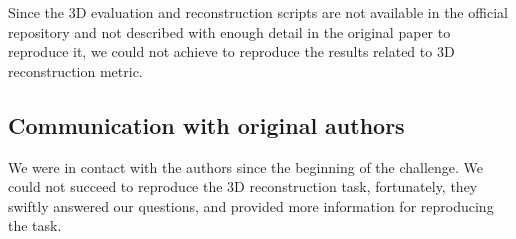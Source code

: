 Since the 3D evaluation and reconstruction scripts are not available in the official repository and not described with enough detail in the original paper to reproduce it, we could not achieve to reproduce the results related to 3D reconstruction metric. 

\subsection{Communication with original authors}
We were in contact with the authors since the beginning of the challenge. We could not succeed to reproduce the 3D reconstruction task, fortunately, they swiftly answered our questions, and provided more information for reproducing the task.

